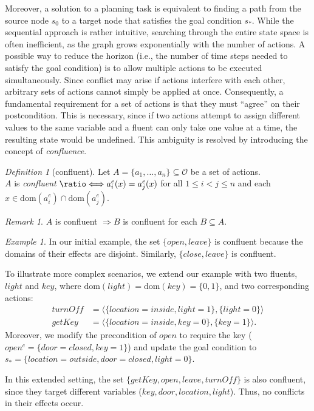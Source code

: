 \documentclass[
     11pt,                    %
     a4paper,             %
     BCOR=10mm,     %
     DIV=14,                 %
     listof=totoc,                    %
     bibliography=totoc,       %
     index=totoc,              %
     parskip            %
     twoside,
     headsepline
     ]{scrreprt}
\theoremstyle{definition}
\theoremstyle{definition}
\theoremstyle{remark}
\newtheorem{example}{\textit{Example}}
\newtheorem*{remark}{Remark}
\theoremstyle{bfnote}
\newtheorem{defi}{Definition}
\newcommand*{\logeq}{\ratio\Longleftrightarrow}
\newcommand{\dom}{\mathrm{dom}}
\begin{document}
Moreover, a solution to a planning task is equivalent to finding a path from the source node $s_0$ to a target node that satisfies the goal condition $s_*$.
While the sequential approach is rather intuitive, searching through the entire state space is often inefficient, as the graph grows exponentially with the number of actions.
A possible way to reduce the horizon (i.e., the number of time steps needed to satisfy the goal condition) is to allow multiple actions to be executed simultaneously.
Since conflict may arise if actions interfere with each other, arbitrary sets of actions cannot simply be applied at once.
Consequently, a fundamental requirement for a set of actions is that they must \enquote{agree} on their postcondition. This is necessary, since if two actions attempt to assign different values to the same variable and a fluent can only take one value at a time, the resulting state would be undefined.
This ambiguity is resolved by introducing the concept of \textit{confluence}.

\begin{defi}[confluent]
  Let $A = \{a_1, \dots, a_n\} \subseteq \mathcal{O}$ be a set of actions.\\
  $A$ is \textit{confluent} $\logeq a_i^e(x) = a_j^e(x)$ for all $1 \le i < j \le n$ and each $x \in \dom(a_i^e) \cap \dom(a_j^e)$.
\end{defi}

\begin{remark}
  $A$ is confluent $\Rightarrow B$ is confluent for each $B \subseteq A$.
\end{remark}

\begin{example}
  In our initial example, the set $\{open, leave\}$ is confluent because the domains of their effects are disjoint. Similarly, $\{close, leave\}$ is confluent.
  
  To illustrate more complex scenarios, we extend our example with two fluents, $light$ and $key$, where $\dom(light) = \dom(key) = \{0, 1\}$, and two corresponding actions:
  \begin{align*}
    \textit{turnOff} &= \langle \{location{=}inside, light{=}1\}, \{light{=}0\} \rangle \\
    \textit{getKey} &= \langle \{location{=}inside, key{=}0\}, \{key{=}1\} \rangle.
  \end{align*}
  Moreover, we modify the precondition of $open$ to require the key ($open^c{=}\{door{=}closed, key{=}1\}$) and update the goal condition to $s_* = \{location{=}outside, door{=}closed, light{=}0\}$.
  
  In this extended setting, the set $\{\mathit{getKey, open, leave, turnOff}\}$ is also confluent, since they target different variables ($key, door, location, light$). Thus, no conflicts in their effects occur.
\end{example}
\end{document}
